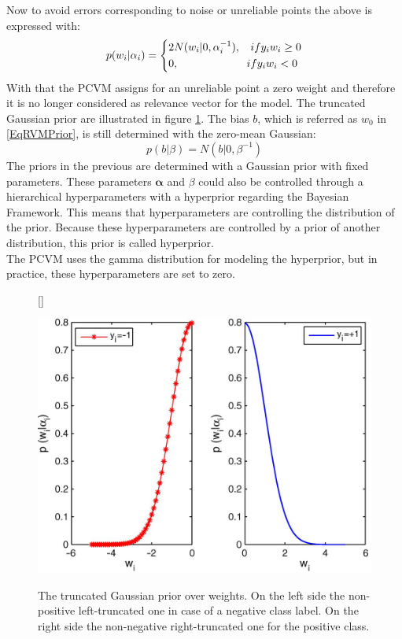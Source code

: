 Now to avoid errors corresponding to noise or unreliable points the above is expressed with:\cite{Chen.2009}
\begin{equation}\label{EqPcvmWSel}
p(w_i \vert \alpha_i) =
\begin{dcases*}
2N(w_i \vert 0,\alpha_i^{-1} ),\>\>\>\>  if y_i w_i \ge 0\\
0				,\>\>\>\>\>\>\>\>\>\>\>\>\>\>\>\>\>\>\>\>\>\>\>\>\>\>\>\> if y_i w_i<0
\end{dcases*}
\end{equation}
With that the \acs{PCVM} assigns for an unreliable point a zero weight and therefore it is no longer considered as relevance vector for the model.
The truncated Gaussian prior are illustrated in figure \ref{FigTruncGaus}.\newline
The bias $b$, which is referred as $w_0$ in \eqref{EqRVMPrior}, is still determined with the zero-mean Gaussian:\cite{Chen.2009}
\begin{equation}\label{EqPcvmBPrior}
p(b \vert \beta) = N(b \vert 0, \beta^{-1})
\end{equation}
The priors in the previous are determined with a Gaussian prior with fixed parameters.
These parameters $\boldsymbol{\alpha }$ and $\beta$ could also be controlled through a hierarchical hyperparameters with a hyperprior regarding the Bayesian Framework.\cite{Chen.2009}
This means that hyperparameters are controlling the distribution of the prior. \cite[p. 71]{Bishop.2009}
Because these hyperparameters are controlled by a prior of another distribution, this prior is called hyperprior.\cite[.p 423]{Bishop.1995}\\
The \acs{PCVM} uses the gamma distribution for modeling the hyperprior, but in practice, these hyperparameters are set to zero.\cite{Chen.2009}
\begin{figure}
	\centering
	[\FBwidth]
	{\caption[Truncated Gaussian Priors over Weights]{The truncated Gaussian prior over weights. On the left side the non-positive left-truncated one in case of a negative class label. On the right side the non-negative right-truncated one for the positive class.\cite{Chen.2009}}}
	{\includegraphics[width=\linewidth]{figures/TuncatedGaussian.png}\label{FigTruncGaus}}
\end{figure}
